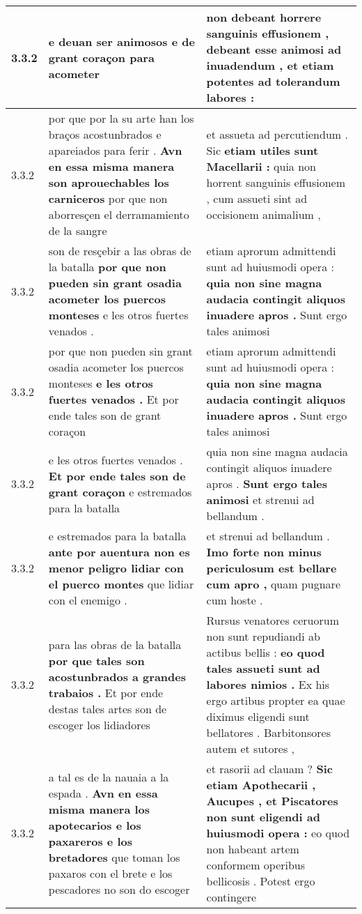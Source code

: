 \begin{tabular}{|p{1cm}|p{6.5cm}|p{6.5cm}|}
3.3.2 & e deuan ser animosos \textbf{ e de grant coraçon } para acometer & non debeant horrere sanguinis effusionem , \textbf{ debeant esse animosi ad inuadendum , } et etiam potentes ad tolerandum labores : \\\hline
3.3.2 & por que por la su arte han los braços acostunbrados e apareiados para ferir . \textbf{ Avn en essa misma manera son aprouechables los carniceros } por que non aborresçen el derramamiento de la sangre & et assueta ad percutiendum . Sic \textbf{ etiam utiles sunt Macellarii : } quia non horrent sanguinis effusionem , cum assueti sint ad occisionem animalium , \\\hline
3.3.2 & son de resçebir a las obras de la batalla \textbf{ por que non pueden sin grant osadia acometer los puercos monteses } e les otros fuertes venados . & etiam aprorum admittendi sunt ad huiusmodi opera : \textbf{ quia non sine magna audacia contingit aliquos inuadere apros . } Sunt ergo tales animosi \\\hline
3.3.2 & por que non pueden sin grant osadia acometer los puercos monteses \textbf{ e les otros fuertes venados . } Et por ende tales son de grant coraçon & etiam aprorum admittendi sunt ad huiusmodi opera : \textbf{ quia non sine magna audacia contingit aliquos inuadere apros . } Sunt ergo tales animosi \\\hline
3.3.2 & e les otros fuertes venados . \textbf{ Et por ende tales son de grant coraçon } e estremados para la batalla & quia non sine magna audacia contingit aliquos inuadere apros . \textbf{ Sunt ergo tales animosi } et strenui ad bellandum . \\\hline
3.3.2 & e estremados para la batalla \textbf{ ante por auentura non es menor peligro lidiar con el puerco montes } que lidiar con el enemigo . & et strenui ad bellandum . \textbf{ Imo forte non minus periculosum est bellare cum apro , } quam pugnare cum hoste . \\\hline
3.3.2 & para las obras de la batalla \textbf{ por que tales son acostunbrados a grandes trabaios . } Et por ende destas tales artes son de escoger los lidiadores & Rursus venatores ceruorum non sunt repudiandi ab actibus bellis : \textbf{ eo quod tales assueti sunt ad labores nimios . } Ex his ergo artibus propter ea quae diximus eligendi sunt bellatores . Barbitonsores autem et sutores , \\\hline
3.3.2 & a tal es de la nauaia a la espada . \textbf{ Avn en essa misma manera los apotecarios e los paxareros e los bretadores } que toman los paxaros con el brete e los pescadores no son do escoger & et rasorii ad clauam ? \textbf{ Sic etiam Apothecarii , Aucupes , et Piscatores non sunt eligendi ad huiusmodi opera : } eo quod non habeant artem conformem operibus bellicosis . Potest ergo contingere \\\hline

\end{tabular}
